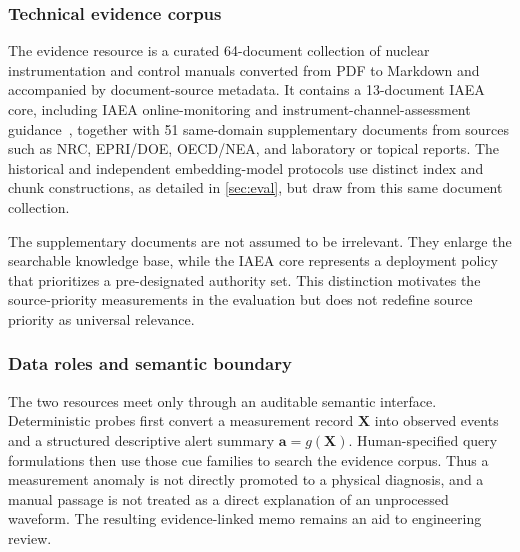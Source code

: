 \subsubsection{Technical evidence corpus}
The evidence resource is a curated 64-document collection of nuclear instrumentation and control manuals converted from PDF to Markdown and accompanied by document-source metadata. It contains a 13-document IAEA core, including IAEA online-monitoring and instrument-channel-assessment guidance~\citep{iaea2008olm1,iaea2008olm2}, together with 51 same-domain supplementary documents from sources such as NRC, EPRI/DOE, OECD/NEA, and laboratory or topical reports. The historical and independent embedding-model protocols use distinct index and chunk constructions, as detailed in \cref{sec:eval}, but draw from this same document collection.

The supplementary documents are not assumed to be irrelevant. They enlarge the searchable knowledge base, while the IAEA core represents a deployment policy that prioritizes a pre-designated authority set. This distinction motivates the source-priority measurements in the evaluation but does not redefine source priority as universal relevance.

\subsubsection{Data roles and semantic boundary}
The two resources meet only through an auditable semantic interface. Deterministic probes first convert a measurement record $\mathbf{X}$ into observed events and a structured descriptive alert summary $\mathbf{a}=g(\mathbf{X})$. Human-specified query formulations then use those cue families to search the evidence corpus. Thus a measurement anomaly is not directly promoted to a physical diagnosis, and a manual passage is not treated as a direct explanation of an unprocessed waveform. The resulting evidence-linked memo remains an aid to engineering review.
